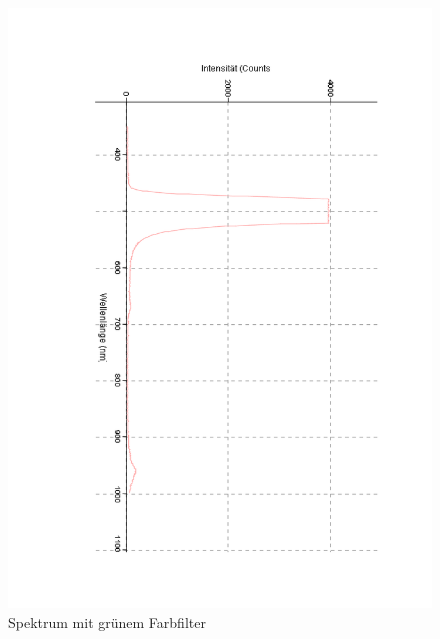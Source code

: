 \documentclass[12pt,a4paper]{article}
\begin{document}
\begin{figure}[H]
	\centering
	\includegraphics[scale=0.5,angle = 90,trim = 20mm 20mm 20mm 20mm]{./data/Spektro/Farbfilter_Absorbtion_Gruen_DO4.pdf}
	\caption{Spektrum mit grünem Farbfilter}
	\label{fig:FilterGruen}
\end{figure}
\end{document}
